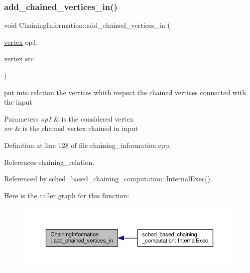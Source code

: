 \subsubsection{\texorpdfstring{add\+\_\+chained\+\_\+vertices\+\_\+in()}{add\_chained\_vertices\_in()}}
{\footnotesize\ttfamily void Chaining\+Information\+::add\+\_\+chained\+\_\+vertices\+\_\+in (\begin{DoxyParamCaption}\item[{\hyperlink{graph_8hpp_abefdcf0544e601805af44eca032cca14}{vertex}}]{op1,  }\item[{\hyperlink{graph_8hpp_abefdcf0544e601805af44eca032cca14}{vertex}}]{src }\end{DoxyParamCaption})}



put into relation the vertices whith respect the chained vertices connected with the input 


\begin{DoxyParams}{Parameters}
{\em op1} & is the considered vertex \\
\hline
{\em src} & is the chained vertex chained in input \\
\hline
\end{DoxyParams}


Definition at line 128 of file chaining\+\_\+information.\+cpp.



References chaining\+\_\+relation.



Referenced by sched\+\_\+based\+\_\+chaining\+\_\+computation\+::\+Internal\+Exec().

Here is the caller graph for this function\+:
\nopagebreak
\begin{figure}[H]
\begin{center}
\leavevmode
\includegraphics[width=350pt]{d8/d93/classChainingInformation_a0fdcde9a175528d1f79dcedc929edc8d_icgraph}
\end{center}
\end{figure}
\mbox{\label{classChainingInformation_af5626b18e31136d5d01910be8836bc16}} 
